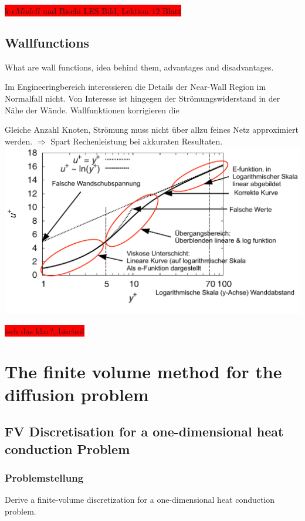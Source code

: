 \documentclass[a4paper]{scrartcl}
\begin{document}
\colorbox{red}{k-$\epsilon Modell$ und Bischi LES Bild, Lektion 12 Blatt}


\subsection{Wallfunctions} 
What are wall functions, idea behind them, advantages
and disadvantages.

Im Engineeringbereich interessieren die Details der Near-Wall Region im
Normalfall nicht. Von Interesse ist hingegen der Strömungswiderstand in der Nähe
der Wände. Wallfunktionen korrigieren die

Gleiche Anzahl Knoten, Strömung muss nicht über allzu feines Netz approximiert
werden. $\Rightarrow$ Spart Rechenleistung bei akkuraten Resultaten.\\

\includegraphics[scale=0.8]{images/wall_function.pdf}

\colorbox{red}{isch das klar?, bischsil}

\section{The finite volume method for the diffusion problem}


\subsection{FV Discretisation for a one-dimensional heat conduction Problem}
\subsubsection{Problemstellung}
Derive a finite-volume discretization for a one-dimensional heat conduction
problem. 
\end{document}
